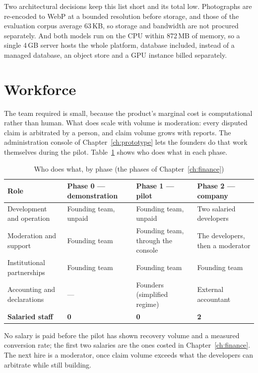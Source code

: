 Two architectural decisions keep this list short and its total low.
Photographs are re-encoded to WebP at a bounded resolution before storage, and
those of the evaluation corpus average 63\,KB, so storage and bandwidth are not
procured separately. And both models run on the CPU within 872\,MB of memory,
so a single 4\,GB server hosts the whole platform, database included, instead
of a managed database, an object store and a GPU instance billed separately.

\section{Workforce}

The team required is small, because the product's marginal cost is
computational rather than human. What does scale with volume is moderation:
every disputed claim is arbitrated by a person, and claim volume grows with
reports. The administration console of Chapter~\ref{ch:prototype} lets the
founders do that work themselves during the pilot. Table~\ref{tab:headcount}
shows who does what in each phase.

\begin{table}[htbp]
\centering
\caption{Who does what, by phase (the phases of Chapter~\ref{ch:finance})}
\label{tab:headcount}
\small
\begin{tabularx}{\textwidth}{@{}X X X X@{}}
\toprule
\textbf{Role} & \textbf{Phase 0 --- demonstration} & \textbf{Phase 1 --- pilot} & \textbf{Phase 2 --- company} \\
\midrule
Development and operation & Founding team, unpaid & Founding team, unpaid & Two salaried developers \\
\addlinespace
Moderation and support    & Founding team & Founding team, through the console & The developers, then a moderator \\
\addlinespace
Institutional partnerships & Founding team & Founding team & Founding team \\
\addlinespace
Accounting and declarations & --- & Founders (simplified regime) & External accountant \\
\midrule
\textbf{Salaried staff}   & \textbf{0} & \textbf{0} & \textbf{2} \\
\bottomrule
\end{tabularx}
\end{table}

No salary is paid before the pilot has shown recovery volume and a measured
conversion rate; the first two salaries are the ones costed in
Chapter~\ref{ch:finance}. The next hire is a moderator, once claim volume
exceeds what the developers can arbitrate while still building.

